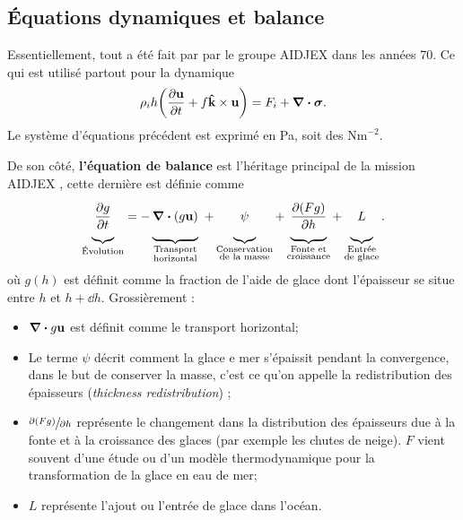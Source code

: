 \documentclass[10pt]{article}
\numberwithin{equation}{section}
\newcommand{\kvf}{\vb{\hat{k}}}
\newcommand{\uu}{\vb{u}}
\newcommand{\venti}{\vphantom{\sum_x^x}}
\begin{document}
\subsection{Équations dynamiques et balance}
\label{sec:org9afab30}
Essentiellement, tout a été fait par \Textcite{coon1974modeling} par le groupe AIDJEX dans les années 70.
Ce qui est utilisé partout pour la dynamique
\begin{equation}
   \rho_i h \qty(\pdv{\uu}{t} + f\kvf\times\uu) = F_i + \divergence{\boldsymbol{\sigma}}.
\end{equation}
Le système d'équations précédent est exprimé en Pa, soit des \(\text{Nm}^{-2}\).

De son côté, \textbf{l'équation de balance} est l'héritage principal de la mission AIDJEX \autocite{coon1974modeling,thorndike1975thickness}, cette dernière est définie comme
\begin{equation}
\label{eq:org762bb2e}
   \underbrace{\venti\pdv{g}{t}}_{\text{Évolution}} =
   -\underbrace{\venti\divergence{(g\uu)}}_{\substack{\text{Transport}\\\text{horizontal}}}\
   +\underbrace{\venti\psi}_{\substack{\text{Conservation}\\\text{de la masse}}}
   +\underbrace{\venti\pdv{(Fg)}{h}}_{\substack{\text{Fonte et}\\\text{croissance}}}
   +\underbrace{\venti L }_{\substack{\text{Entrée}\\\text{de glace}}}.
\end{equation}
où \(g(h)\) est définit comme la fraction de l'aide de glace dont l'épaisseur se situe entre \(h\) et \(h+\dd h\).
Grossièrement :
\begin{itemize}
\item \(\divergence{g\uu}\) est définit comme le transport horizontal;
\item Le terme \(\psi\) décrit comment la glace e mer s'épaissit pendant la convergence, dans le but de conserver la masse, c'est ce qu'on appelle la redistribution des épaisseurs (\emph{thickness redistribution}) \autocite[Voir][]{thorndike1975thickness};
\item \(\sfrac{\partial(Fg)}{\partial h}\) représente le changement dans la distribution des épaisseurs due à la fonte et à la croissance des glaces (par exemple les chutes de neige).
\(F\) vient souvent d'une étude ou d'un modèle thermodynamique pour la transformation de la glace en eau de mer;
\item \(L\) représente l'ajout ou l'entrée de glace dans l'océan.\bigskip
\end{itemize}
\end{document}
